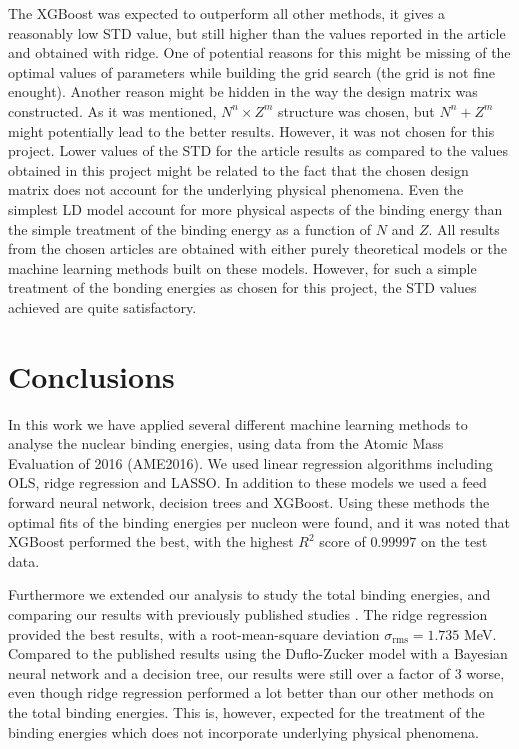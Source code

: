 \documentclass[numberedappendix, twocolappendix]{emulateapj}
\begin{document}
The XGBoost was expected to outperform all other methods, it gives a reasonably low STD value, but still higher than the values reported in the article and obtained with ridge. One of potential reasons for this might be missing of the optimal values of parameters while building the grid search (the grid is not fine enought). Another reason might be hidden in the way the design matrix was constructed. As it was mentioned, $N^n\times Z^m$ structure was chosen, but $N^n+ Z^m$ might potentially lead to the better results. However, it was not chosen for this project. Lower values of the STD for the article results as compared to the values obtained in this project might be related to the fact that the chosen design matrix does not account for the underlying physical phenomena. Even the simplest LD model account for more physical aspects of the binding energy than the simple treatment of the binding energy as a function of $N$ and $Z$. All results from the chosen articles are obtained with either purely theoretical models or the machine learning methods built on these models. However, for such a simple treatment of the bonding energies as chosen for this project, the STD values achieved are quite satisfactory.

\section{Conclusions} 
\label{sec: Conclusions}
In this work we have applied several different machine learning methods to analyse the nuclear binding energies, using data from the Atomic Mass Evaluation of 2016 (AME2016). We used linear regression algorithms including OLS, ridge regression and LASSO. In addition to these models we used a feed forward neural network, decision trees and XGBoost. Using these methods the optimal fits of the binding energies per nucleon were found, and it was noted that XGBoost performed the best, with the highest $R^2$ score of $0.99997$ on the test data.

Furthermore we extended our analysis to study the total binding energies, and comparing our results with previously published studies \cite{utama2017, trees in nuclear}. The ridge regression provided the best results, with a root-mean-square deviation $\sigma_{\mathrm{rms}} = 1.735$ MeV. Compared to the published results using the Duflo-Zucker model with a Bayesian neural network and a decision tree, our results were still over a factor of $3$ worse, even though ridge regression performed a lot better than our other methods on the total binding energies. This is, however, expected for the treatment of the binding energies which does not incorporate underlying physical phenomena.
\end{document}
